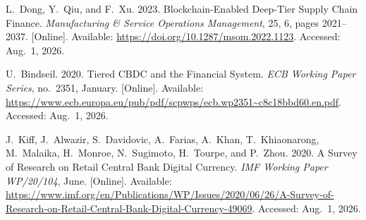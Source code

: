 {\begin{enumerate}[label={[\arabic*]}]
\item L.~Dong, Y.~Qiu, and F.~Xu. 2023. Blockchain-Enabled Deep-Tier Supply Chain Finance. \emph{Manufacturing \& Service Operations Management}, 25, 6, pages 2021--2037. [Online]. Available: \url{https://doi.org/10.1287/msom.2022.1123}. Accessed: Aug.~1, 2026.

\item U.~Bindseil. 2020. Tiered CBDC and the Financial System. \emph{ECB Working Paper Series}, no.~2351, January. [Online]. Available: \url{https://www.ecb.europa.eu/pub/pdf/scpwps/ecb.wp2351~c8c18bbd60.en.pdf}. Accessed: Aug.~1, 2026.

\item J.~Kiff, J.~Alwazir, S.~Davidovic, A.~Farias, A.~Khan, T.~Khiaonarong, M.~Malaika, H.~Monroe, N.~Sugimoto, H.~Tourpe, and P.~Zhou. 2020. A Survey of Research on Retail Central Bank Digital Currency. \emph{IMF Working Paper WP/20/104}, June. [Online]. Available: \url{https://www.imf.org/en/Publications/WP/Issues/2020/06/26/A-Survey-of-Research-on-Retail-Central-Bank-Digital-Currency-49069}. Accessed: Aug.~1, 2026.






\end{enumerate}}
